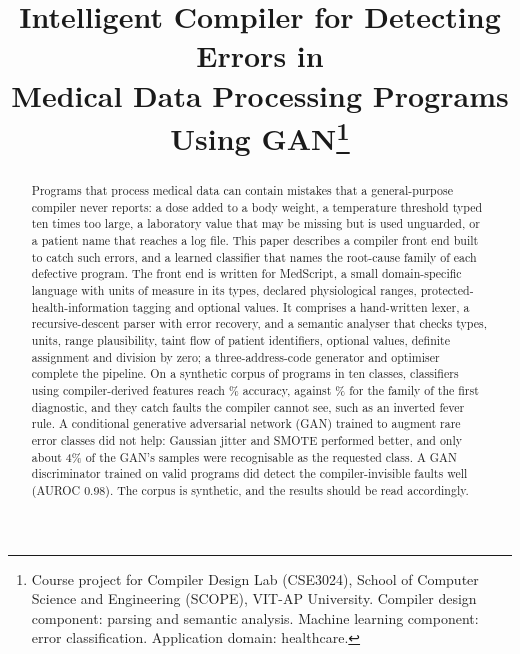 \documentclass[conference]{IEEEtran}
\begin{document}
\title{Intelligent Compiler for Detecting Errors in\\
Medical Data Processing Programs Using GAN\thanks{Course project for Compiler Design Lab (CSE3024), School of Computer
Science and Engineering (SCOPE), VIT-AP University. Compiler design component: parsing and semantic analysis.
Machine learning component: error classification. Application domain: healthcare.}}

\author{
\and
{}
}

\maketitle

\begin{abstract}
Programs that process medical data can contain mistakes that a general-purpose compiler never reports: a dose added to a
body weight, a temperature threshold typed ten times too large, a laboratory value that may be missing but is used
unguarded, or a patient name that reaches a log file. This paper describes a compiler front end built to catch such
errors, and a learned classifier that names the root-cause family of each defective program. The front end is written for
MedScript, a small domain-specific language with units of measure in its types, declared physiological ranges,
protected-health-information tagging and optional values. It comprises a hand-written lexer, a recursive-descent parser with
error recovery, and a semantic analyser that checks types, units, range plausibility, taint flow of patient identifiers,
optional values, definite assignment and division by zero; a three-address-code generator and optimiser complete the
pipeline. On a synthetic corpus of \NProg{} programs in ten classes, classifiers using compiler-derived features reach
\RFAcc\% accuracy, against \RuleFirstAcc\% for the family of the first diagnostic, and they catch faults the compiler cannot see,
such as an inverted fever rule. A conditional generative adversarial network (GAN) trained to augment rare error classes did not
help: Gaussian jitter and SMOTE performed better, and only about 4\% of the GAN's samples were recognisable as the requested class.
A GAN discriminator trained on valid programs did detect the compiler-invisible faults well (AUROC 0.98). The corpus is synthetic,
and the results should be read accordingly.
\end{abstract}
\end{document}
